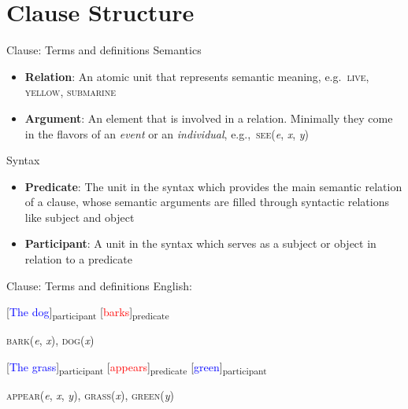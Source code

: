 \section{Clause Structure}

\begin{frame}{Clause: Terms and definitions}
Semantics
\begin{itemize}
\item \textbf{Relation}: An atomic unit that represents semantic meaning, e.g.\ \textsc{live}, \textsc{yellow}, \textsc{submarine}
\item \textbf{Argument}: An element that is involved in a relation. Minimally they come in the flavors of an \textit{event} or an \textit{individual}, e.g.,\ \textsc{see}(\textit{e}, \textit{x}, \textit{y})
\end{itemize}
Syntax
\begin{itemize}
\item \textbf{Predicate}: The unit in the syntax which provides the main semantic relation of a clause, whose semantic arguments are filled through syntactic relations like subject and object
\item \textbf{Participant}: A unit in the syntax which serves as a subject or object in relation to a predicate
\end{itemize}
\end{frame}

\begin{frame}{Clause: Terms and definitions}
English:

\ex[exno=1] \label{ex:dogbarks}
[\textcolor{blue}{The dog}]\textsubscript{participant} [\textcolor{red}{barks}]\textsubscript{predicate}
\xe

\pause

\hspace{20pt} \textsc{bark}(\textit{e}, \textit{x}), \textsc{dog}(\textit{x})

\pause

\ex[exno=2] \label{ex:grassgreen}
[\textcolor{blue}{The grass}]\textsubscript{participant} [\textcolor{red}{appears}]\textsubscript{predicate} [\textcolor{blue}{green}]\textsubscript{participant}
\xe


\pause

\hspace{20pt} \textsc{appear}(\textit{e}, \textit{x}, \textit{y}), \textsc{grass}(\textit{x}), \textsc{green}(\textit{y})

\end{frame}

